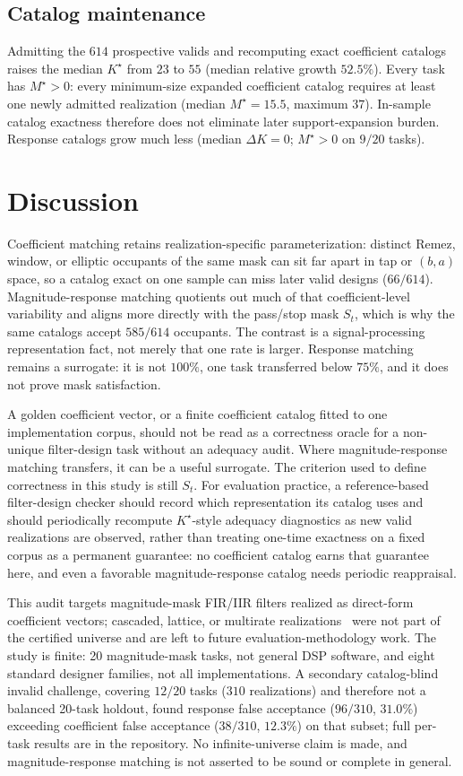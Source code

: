 \documentclass{article}
\begin{document}
\subsection{Catalog maintenance}
Admitting the $614$ prospective valids and recomputing exact
coefficient catalogs raises the median $K^\star$ from $23$ to
$55$ (median relative growth $52.5\%$).
Every task has $M^\star>0$: every minimum-size expanded
coefficient catalog requires at least one newly admitted
realization (median $M^\star=15.5$, maximum $37$).
In-sample catalog exactness therefore does not eliminate later
support-expansion burden.
Response catalogs grow much less (median $\Delta K=0$;
$M^\star>0$ on $9/20$ tasks).

\section{Discussion}
\label{sec:disc}

Coefficient matching retains realization-specific
parameterization: distinct Remez, window, or elliptic
occupants of the same mask can sit far apart in tap or
$(b,a)$ space, so a catalog exact on one sample can miss later
valid designs ($66/614$).
Magnitude-response matching quotients out much of that
coefficient-level variability and aligns more directly with the
pass/stop mask $S_t$, which is why the same catalogs accept
$585/614$ occupants.
The contrast is a signal-processing representation fact, not
merely that one rate is larger.
Response matching remains a surrogate: it is not $100\%$, one
task transferred below $75\%$, and it does not prove mask
satisfaction.

A golden coefficient vector, or a finite coefficient catalog
fitted to one implementation corpus, should not be read as a
correctness oracle for a non-unique filter-design task without an
adequacy audit.
Where magnitude-response matching transfers, it can be a useful
surrogate.
The criterion used to define correctness in this study is still
$S_t$.
For evaluation practice, a reference-based filter-design checker
should record which representation its catalog uses and should
periodically recompute $K^\star$-style adequacy diagnostics as new
valid realizations are observed, rather than treating one-time
exactness on a fixed corpus as a permanent guarantee: no coefficient
catalog earns that guarantee here, and even a favorable
magnitude-response catalog needs periodic reappraisal.

This audit targets magnitude-mask FIR/IIR filters realized as
direct-form coefficient vectors; cascaded, lattice, or multirate
realizations~\cite{vaidyanathan1993multirate} were not part of the
certified universe and are left to future evaluation-methodology
work.
The study is finite: 20 magnitude-mask tasks, not general DSP
software, and eight standard designer families, not all
implementations.
A secondary catalog-blind invalid challenge, covering $12/20$ tasks
($310$ realizations) and therefore not a balanced 20-task holdout,
found response false acceptance ($96/310$, $31.0\%$) exceeding
coefficient false acceptance ($38/310$, $12.3\%$) on that subset;
full per-task results are in the repository.
No infinite-universe claim is made, and magnitude-response
matching is not asserted to be sound or complete in general.
\end{document}
